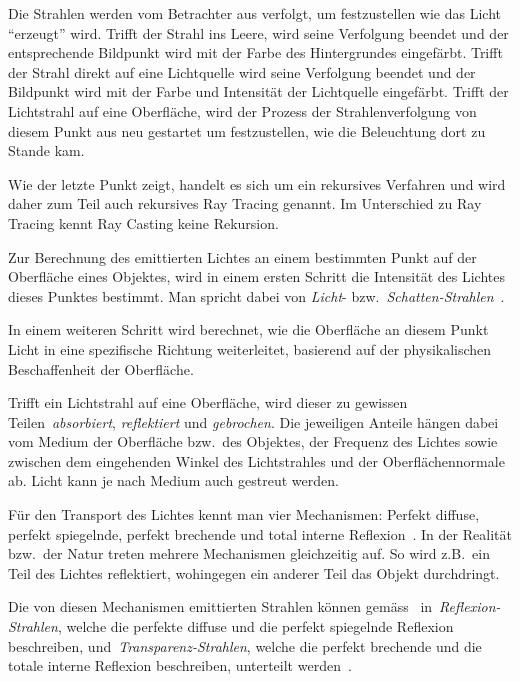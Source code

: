 Die Strahlen werden vom Betrachter aus verfolgt, um festzustellen wie
das Licht ``erzeugt'' wird. Trifft der Strahl ins Leere, wird seine
Verfolgung beendet und der entsprechende Bildpunkt wird mit der Farbe
des Hintergrundes eingefärbt. Trifft der Strahl direkt auf eine
Lichtquelle wird seine Verfolgung beendet und der Bildpunkt wird mit der
Farbe und Intensität der Lichtquelle eingefärbt. Trifft der Lichtstrahl
auf eine Oberfläche, wird der Prozess der Strahlenverfolgung von diesem
Punkt aus neu gestartet um festzustellen, wie die Beleuchtung dort zu
Stande kam.

Wie der letzte Punkt zeigt, handelt es sich um ein rekursives Verfahren
und wird daher zum Teil auch rekursives Ray Tracing genannt. Im
Unterschied zu Ray Tracing kennt Ray Casting keine Rekursion.

Zur Berechnung des emittierten Lichtes an einem bestimmten Punkt auf der
Oberfläche eines Objektes, wird in einem ersten Schritt die Intensität
des Lichtes dieses Punktes bestimmt. Man spricht dabei von
\textit{Licht}- bzw.\ \textit{Schatten-Strahlen}~\parencite[S.
10]{glassner_introduction_1989}.

In einem weiteren Schritt wird berechnet, wie die Oberfläche an
diesem Punkt Licht in eine spezifische Richtung weiterleitet, basierend
auf der physikalischen Beschaffenheit der Oberfläche.

Trifft ein Lichtstrahl auf eine Oberfläche, wird dieser zu gewissen
Teilen~\textit{absorbiert}, \textit{reflektiert} und \textit{gebrochen}.
Die jeweiligen Anteile hängen dabei vom Medium der Oberfläche bzw.~des
Objektes, der Frequenz des Lichtes sowie zwischen dem eingehenden Winkel
des Lichtstrahles und der Oberflächennormale ab.  Licht kann je nach
Medium auch gestreut werden.

Für den Transport des Lichtes kennt man vier Mechanismen: Perfekt
diffuse, perfekt spiegelnde, perfekt brechende und total interne
Reflexion~\parencite[S. 130 bis 137]{glassner_introduction_1989}. In der
Realität bzw.~der Natur treten mehrere Mechanismen gleichzeitig auf.  So
wird z.B.\ ein Teil des Lichtes reflektiert, wohingegen ein anderer Teil
das Objekt durchdringt.

Die von diesen Mechanismen emittierten Strahlen können
gemäss~\citeauthor{glassner_introduction_1989}
in~\textit{Reflexion-Strahlen}, welche die perfekte diffuse und die
perfekt spiegelnde Reflexion beschreiben,
und~\textit{Transparenz-Strahlen}, welche die perfekt brechende und die
totale interne Reflexion beschreiben, unterteilt werden~\parencite[S.
10]{glassner_introduction_1989}.


